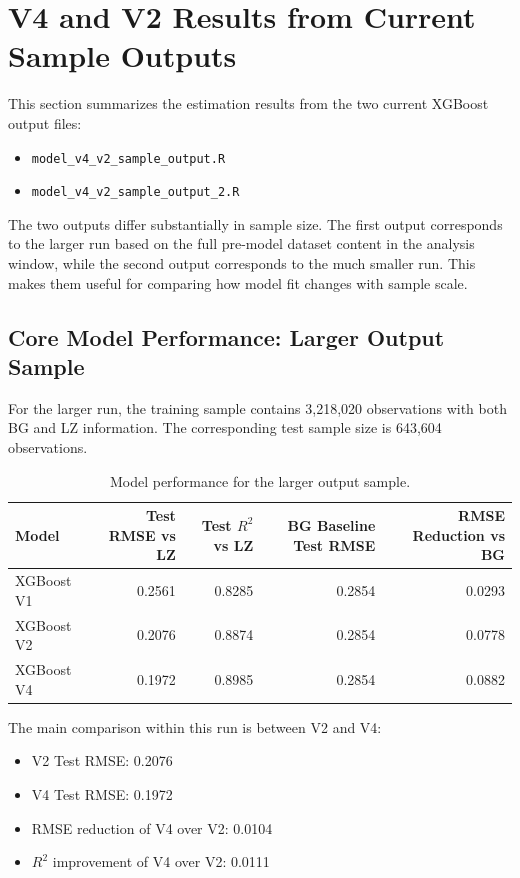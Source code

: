 \documentclass{article}
\begin{document}
\newpage
\section{V4 and V2 Results from Current Sample Outputs}

This section summarizes the estimation results from the two current XGBoost output files:
\begin{itemize}
    \item \texttt{model\_v4\_v2\_sample\_output.R}
    \item \texttt{model\_v4\_v2\_sample\_output\_2.R}
\end{itemize}

The two outputs differ substantially in sample size. The first output corresponds to the larger run based on the full pre-model dataset content in the analysis window, while the second output corresponds to the much smaller run. This makes them useful for comparing how model fit changes with sample scale.

\subsection{Core Model Performance: Larger Output Sample}

For the larger run, the training sample contains 3,218,020 observations with both BG and LZ information. The corresponding test sample size is 643,604 observations.

\begin{table}[H]
\centering
\begin{tabular}{lrrrr}
\toprule
Model & Test RMSE vs LZ & Test $R^2$ vs LZ & BG Baseline Test RMSE & RMSE Reduction vs BG \\
\midrule
XGBoost V1 & 0.2561 & 0.8285 & 0.2854 & 0.0293 \\
XGBoost V2 & 0.2076 & 0.8874 & 0.2854 & 0.0778 \\
XGBoost V4 & 0.1972 & 0.8985 & 0.2854 & 0.0882 \\
\bottomrule
\end{tabular}
\caption{Model performance for the larger output sample.}
\label{tab:v4_large_performance}
\end{table}

\noindent
The main comparison within this run is between V2 and V4:
\begin{itemize}
    \item V2 Test RMSE: 0.2076
    \item V4 Test RMSE: 0.1972
    \item RMSE reduction of V4 over V2: 0.0104
    \item $R^2$ improvement of V4 over V2: 0.0111
\end{itemize}
\end{document}
